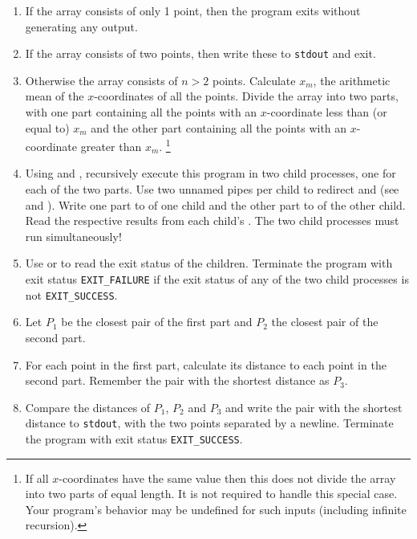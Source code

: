 \begin{enumerate}
\item If the array consists of only 1 point, then the program exits without generating any output.

\item If the array consists of two points, then write these to \texttt{stdout} and exit.

\item Otherwise the array consists of $n>2$ points.
Calculate $x_m$, the arithmetic mean of the $x$-coordinates of all the points.
Divide the array into two parts,
with one part containing all the points
with an $x$-coordinate less than (or equal to) $x_m$
and the other part containing all the points
with an $x$-coordinate greater than $x_m$.
\footnote{If all $x$-coordinates have the same value then this does not divide the array into two parts of equal length. It is not required to handle this special case. Your program's behavior may be undefined for such inputs (including infinite recursion).} 

\item Using  and ,
recursively execute this program in two child processes,
one for each of the two parts.
Use two unnamed pipes per child
to redirect  and 
(see  and ).
Write one part to  of one child
and the other part to  of the other child.
Read the respective results from each child's .
The two child processes must run simultaneously!

\item Use  or 
to read the exit status of the children.
Terminate the program with exit status \verb|EXIT_FAILURE|
if the exit status of any of the two child processes is not \verb|EXIT_SUCCESS|.

\item Let $P_1$ be the closest pair of the first part and $P_2$ the closest pair of the second part.

\item For each point in the first part,
calculate its distance to each point in the second part.
Remember the pair with the shortest distance as $P_3$.

\item Compare the distances of $P_1$, $P_2$ and $P_3$
and write the pair with the shortest distance to \texttt{stdout},
with the two points separated by a newline.
Terminate the program with exit status \verb|EXIT_SUCCESS|.
\end{enumerate}

